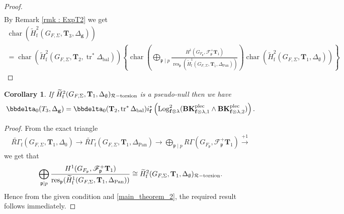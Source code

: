 \documentclass[10pt]{amsart}
\numberwithin{equation}{section}
\newtheorem{cor}[thm]{Corollary}
\theoremstyle{definition}
\theoremstyle{remark} %
\DeclareMathOperator{\Char}{char}
\newcommand{\Log}{\operatorname{Log}}
\newcommand{\pan}{\mathrm{Pan}}
\DeclareMathOperator{\res}{res}
\newcommand{\f}{\mathbf{f}}
\newcommand{\scrF}{\mathscr{F}}
\newcommand{\g}{\mathbf{g}}
\newcommand{\G}{G_{F,\Sigma}}
\newcommand{\p}{\mathfrak{p}}
\newcommand{\R}{\mathcal{R}}
\newcommand{\T}{\mathbf{T}}
\newcommand{\dcom}{\widetilde{R\Gamma}_{\mathrm{f}}}
\begin{document}
\begin{proof}
\begin{multline}
			\end{multline}
			By Remark \ref{rmk : ExpT2} we get
			\begin{multline}
				\Char \left( \widetilde{H}^2_{\mathrm{f}}(G_{F,\Sigma}, \T_3, \Delta_{\g})  \right) \\
				= \Char(\widetilde{H}^2_{\mathrm{f}}(G_{F,\Sigma}, \T_2, \operatorname{tr}^*\Delta_{\mathrm{bal}}))
				\left\lbrace \Char\left( \bigoplus_{\p \mid p}\frac{H^1(G_{F_\p},\scrF^+_\p \T_{1})}{\res_{\p}(\widetilde{H}^1_{\mathrm{f}}(G_{F,\Sigma},\T_{1}, \Delta_{\pan})) }\right) \Char(\widetilde{H}^2_{\mathrm{f}}(G_{F,\Sigma}, \T_1, \Delta_{\emptyset})) \right\rbrace 
			\end{multline}
			
		\end{proof}

		\begin{cor}
			\label{cor_main_2} 
			If $ \widetilde{H}^2_{\mathrm{f}}(G_{F,\Sigma}, \T_1, \Delta_{\emptyset})_{\R\rm -torsion} $ is a pseudo-null then we have 
			\begin{align}
				\label{7.26}
				\bbdelta_0(T_3, \Delta_{\g})= \bbdelta_0(\T_2, \operatorname{tr}^*\Delta_{\mathrm{bal}}) 
				i_\f^*\left( \Log^2_{\f \otimes \lambda}(\mathbf{BK}^{\rm plec}_{\f \otimes \lambda, 1} \wedge \mathbf{BK}^{\rm plec}_{\f \otimes \lambda, 2} ) \right) .
			\end{align}
		\end{cor}
		\begin{proof}
			From the exact triangle 
			\begin{align}
				\dcom(\G, \T_{1}, \Delta_0) \rightarrow \dcom(\G, \T_{1}, \Delta_\pan) \rightarrow \bigoplus_{\p \mid p} R\Gamma (G_{F_\p}, \scrF_{\p}^+ \T_{1}) \xrightarrow{+1}
			\end{align}
			we get that 
			\[\bigoplus_{\p \mid p}\frac{H^1(G_{F_\p},\scrF^+_\p \T_{1})}{\res_{\p}(\widetilde{H}^1_{\mathrm{f}}(G_{F,\Sigma},\T_{1}, \Delta_{\pan})) } \cong \widetilde{H}^2_{\mathrm{f}}(G_{F,\Sigma}, \T_1, \Delta_{\emptyset})_{\R\rm -torsion}.  \]
			Hence from the given condition and \cref{main_theorem_2}, the required result follows immediately.
		\end{proof}
\end{document}
